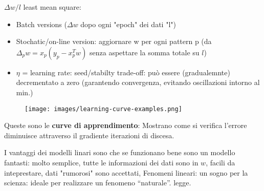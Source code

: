 $\Delta w/l$ least mean square:
\begin{itemize}
    \item Batch versions ($\Delta w$ dopo ogni "epoch" dei dati "l")
    \item Stochatic/on-line version: aggiornare w per ogni pattern p (da $\Delta_p w = x_p (y_p - x_p^T w)$ senza aspettare la somma totale su $l$)
    \item $\eta$ = learning rate: seed/stabilty trade-off: può essere (gradualemnte) decrementato a zero (garantendo convergenza, 
    evitando oscillazioni intorno al min.)
\end{itemize}
\begin{figure}[h!]
    \centering
    \texttt{[image: images/learning-curve-examples.png]}
\end{figure}
\begin{definition}
    Queste sono le \textbf{curve di apprendimento}: Mostrano come si verifica l'errore diminuisce attraverso il gradiente iterazioni di discesa.
\end{definition}
\hspace{-15pt}I vantaggi dei modelli linari sono che se funzionano bene sono un modello fantasti: molto semplice,
tutte le informazioni dei dati sono in $w$, facili da inteprestare, dati "rumorosi" sono accettati, Fenomeni lineari: un sogno per la scienza: ideale per realizzare un fenomeno “naturale”.
legge.